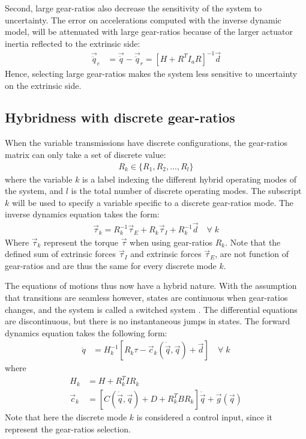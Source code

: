 Second, large gear-ratios also decrease the sensitivity of the system to uncertainty. The error on accelerations computed with the inverse dynamic model, will be attenuated with large gear-ratios because of the larger actuator inertia reflected to the extrinsic side:
\begin{align}
	\vec{\ddot{q}}_e &= \vec{\ddot{q}} - \vec{\ddot{q}}_r = 
	\left[ 
    H + R^T I_a R
	\right]^{-1}
    \vec{d}
 \label{eq:sens}
\end{align}
%
Hence, selecting large gear-ratios makes the system less sensitive to uncertainty on the extrinsic side.

\subsection{Hybridness with discrete gear-ratios}
\label{sec:hyb}

When the variable transmissions have discrete configurations, the gear-ratios matrix can only take a set of discrete value:
%
\begin{align}
	R_k \in \{R_1,R_2, ... , R_l\} 
\end{align}
%
where the variable $k$ is a label indexing the different hybrid operating modes of the system, and $l$ is the total number of discrete operating modes. The subscript $k$ will be used to specify a variable specific to a discrete gear-ratios mode. The inverse dynamics equation takes the form:
%
\begin{align}
	\vec{\tau}_k =  R_k^{-1} \vec{\tau}_E + R_k \vec{\tau}_I + R_k^{-1} \vec{d} \quad\forall \; k
\end{align}
%
Where $\vec{\tau}_k$ represent the torque $\vec{\tau}$ when using gear-ratios $R_k$. Note that the defined sum of extrinsic forces $\vec{\tau}_I$ and extrinsic forces $\vec{\tau}_E$, are not function of gear-ratios and are thus the same for every discrete mode $k$. 

The equations of motions thus now have a hybrid nature. With the assumption that transitions are seamless however, states are continuous when gear-ratios changes, and the system is called a switched system \cite{liberzon_switching_2003}. The differential equations are discontinuous, but there is no instantaneous jumps in states. The forward dynamics equation takes the following form:
%
\begin{align}
	\ddot{q}  &=  H_k^{-1} \left[ R_k \tau - \vec{c}_k( \dot{\vec{q}} , \vec{q} ) + \vec{d} \right] \quad\forall \; k 
\end{align}
%
where 
%
\begin{align}
	H_k       &=  H + R_k^T I R_k \\
	\vec{c}_k &=  \left[ C(\dot{\vec{q}} , \vec{q}) + D + R_k^T B R_k  \right] \dot{\vec{q}} + \vec{g}( \vec{q} ) 
\end{align}
%
Note that here the discrete mode $k$ is considered a control input, since it represent the gear-ratios selection.

